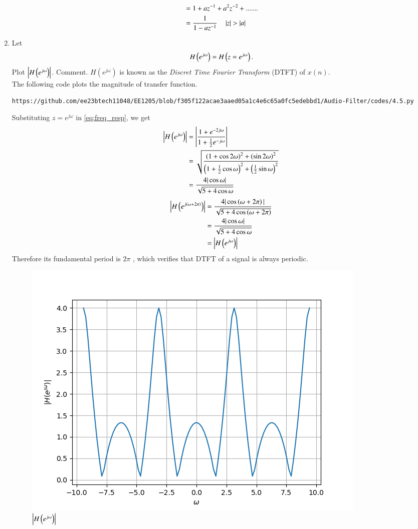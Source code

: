 \documentclass[journal,12pt,twocolumn]{IEEEtran}
\theoremstyle{remark}
\begin{document}
\begin{enumerate}[label=\thesection.\arabic*,ref=\thesection.\theenumi]
\begin{align}
 &= 1+ az^{-1}+a^2z^{-2}+.......\\
			&= \frac{1}{1-az^{-1}} \quad \left\vert z\right\vert > \left\vert a\right\vert
\end{align}
%
\item 
Let
\begin{equation}
	H\left(e^{j \omega}\right) = H\left(z = e^{j \omega}\right).
\end{equation}
Plot $\left\vert H\left(e^{j \omega}\right)\right\vert$.  Comment.  $H(e^{j \omega})$ is
known as the {\em Discret Time Fourier Transform} (DTFT) of $x(n)$.
\\
\solution The following code plots the magnitude of transfer function.
\begin{lstlisting}
https://github.com/ee23btech11048/EE1205/blob/f305f122acae3aaed05a1c4e6c65a0fc5edebbd1/Audio-Filter/codes/4.5.py
\end{lstlisting}
Substituting $z = e^{j \omega}$ in \eqref{eq:freq_resp}, we get
\begin{align}
	\left|H\left(e^{j\omega}\right)\right| &= \left|\frac{1 + e^{-2j\omega}}{1 + \frac{1}{2}e^{-j\omega}}\right| \\
									  &= \sqrt{\frac{\left(1 + \cos{2\omega}\right)^2 + \left(\sin{2\omega}\right)^2}{\left(1 + \frac{1}{2}\cos{\omega}\right)^2 + \left(\frac{1}{2}\sin{\omega}\right)^2}}\\
									  &= \frac{4|\cos{\omega}|}{\sqrt{5 + 4\cos{\omega}}}
\end{align}
\begin{align}
	\left|H\left(e^{j\left(\omega + 2\pi\right)}\right)\right| &= \frac{4|\cos\left(\omega + 2\pi\right)|}{\sqrt{5 + 4\cos\left(\omega + 2\pi\right)}} \\
											   &= \frac{4|\cos{\omega}|}{\sqrt{5 + 4\cos{\omega}}} \\
											   &= \left|H\left(e^{j\omega}\right)\right|	
\end{align}
Therefore its fundamental period is $2\pi$ , which verifies that DTFT of a signal is always periodic.
\begin{figure}[H]
\centering
\includegraphics[width=\columnwidth]{figs/H(z)_4.5.png}
\caption{$\left\vert H\left(e^{j\omega}\right)\right\vert$}
\label{fig:H(z)_3.5}
\end{figure}
\end{enumerate}
\end{document}
